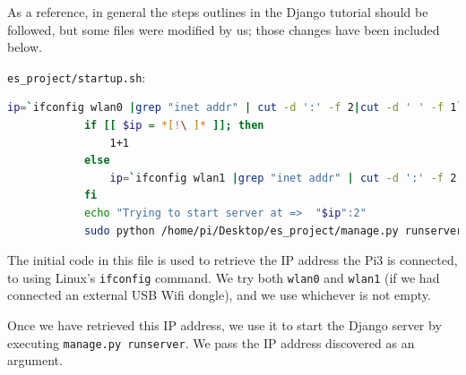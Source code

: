 
	
	As a reference, in general the steps outlines in the Django tutorial \cite{DjangoTutorial} should be followed, but some files were modified by us; those changes have been included below.
	
	\begin{description}[font=\quad $\circ$, topsep=-2pt, itemsep=2pt]
		\item \texttt{es\_project/startup.sh}:
		
		\begin{lstlisting}[language=bash]
			ip=`ifconfig wlan0 |grep "inet addr" | cut -d ':' -f 2|cut -d ' ' -f 1`
			if [[ $ip = *[!\ ]* ]]; then
				1+1
			else 
				ip=`ifconfig wlan1 |grep "inet addr" | cut -d ':' -f 2|cut -d ' ' -f 1`
			fi
			echo "Trying to start server at =>  "$ip":2"
			sudo python /home/pi/Desktop/es_project/manage.py runserver $ip:2
		\end{lstlisting}
		
		The initial code in this file is used to retrieve the IP address the Pi3 is connected, to using Linux's \texttt{ifconfig} command. We try both \texttt{wlan0} and \texttt{wlan1} (if we had connected an external USB Wifi dongle), and we use whichever is not empty. 
		
		Once we have retrieved this IP address, we use it to start the Django server by executing \texttt{manage.py runserver}. We pass the IP address discovered as an argument.
	\end{description}